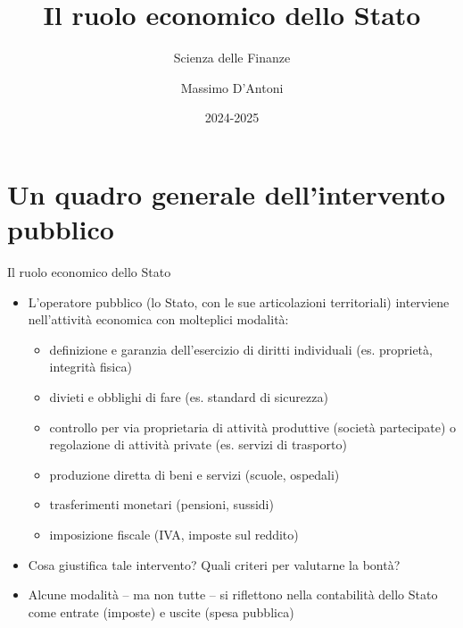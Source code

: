 \documentclass[aspectratio=64,12pt]{beamer}
\institute{Università di Siena}
\author{Massimo D'Antoni}
\date{2024-2025}
\title{Il ruolo economico dello Stato}
\subtitle{Scienza delle Finanze}
\begin{document}
\maketitle

\section{Un quadro generale dell'intervento pubblico}


\begin{frame}{Il ruolo economico dello Stato}
\begin{itemize}
\item L'operatore pubblico (lo Stato, con le sue articolazioni territoriali)
interviene nell'attività economica con molteplici modalità:
\begin{itemize}
\item definizione e garanzia dell'esercizio di diritti individuali
(es. proprietà, integrità fisica)
\item divieti e obblighi di fare (es. standard di sicurezza)
\item controllo per via proprietaria di attività produttive (società
partecipate) o regolazione di attività private (es. servizi di trasporto)
\item produzione diretta di beni e servizi (scuole, ospedali)
\item trasferimenti monetari (pensioni, sussidi)
\item imposizione fiscale (IVA, imposte sul reddito)
\end{itemize}
\item Cosa giustifica tale intervento? Quali criteri per valutarne la bontà?
\item Alcune modalità – ma non tutte – si riflettono nella contabilità dello Stato
come entrate (imposte) e uscite (spesa pubblica)
\end{itemize}
\end{frame}
\end{document}
